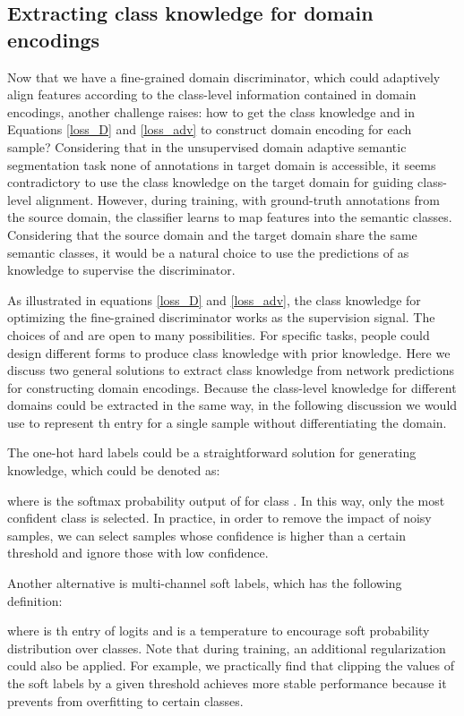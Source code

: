 \documentclass[runningheads]{llncs}
\begin{document}
\subsection{Extracting class knowledge for domain encodings}
\label{class_level_info}
Now that we have a fine-grained domain discriminator, which could adaptively align features according to the class-level information contained in domain encodings, another challenge raises: how to get the class knowledge  and  in Equations \ref{loss_D} and \ref{loss_adv} to construct domain encoding for each sample? Considering that in the unsupervised domain adaptive semantic segmentation task none of annotations in target domain is accessible, it seems contradictory to use the class knowledge on the target domain for guiding class-level alignment. However, during training, with ground-truth annotations from the source domain, the classifier  learns to map features into the semantic classes. Considering that the source domain and the target domain share the same semantic classes, it would be a natural choice to use the predictions of  as knowledge to supervise the discriminator.

As illustrated in equations \ref{loss_D} and \ref{loss_adv}, the class knowledge for optimizing the fine-grained discriminator works as the supervision signal. The choices of  and  are open to many possibilities. For specific tasks, people could design different forms to produce class knowledge with prior knowledge. Here we discuss two general solutions to extract class knowledge from network predictions for constructing domain encodings. Because the class-level knowledge for different domains could be extracted in the same way, in the following discussion we would use  to represent th entry for a single sample without differentiating the domain.





The one-hot hard labels could be a straightforward solution for generating knowledge, which could be denoted as: 


where  is the softmax probability output of  for class .
In this way, only the most confident class is selected. In practice, in order to remove the impact of noisy samples, we can select samples whose confidence is higher than a certain threshold and ignore those with low confidence. 


Another alternative is multi-channel soft labels, which has the following definition: 

where  is th entry of logits and  is a temperature to encourage soft probability distribution over classes. Note that during training, an additional regularization could also be applied. For example, we practically find that clipping the values of the soft labels by a given threshold achieves more stable performance because it prevents from overfitting to certain classes.
  
\end{document}
